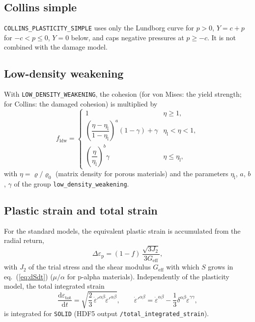 \documentclass[10pt,fleqn,twoside]{article}
\newcommand{\code}[1]{\texttt{#1}}
\newcommand{\sw}[1]{\texttt{#1}}
\newcommand{\dd}{\mathrm{d}}
\begin{document}
\subsection{Collins simple}
\sw{COLLINS\_PLASTICITY\_SIMPLE} uses only the Lundborg curve for $p > 0$, $Y = c + p$ for $-c < p \leq 0$, $Y = 0$
below, and caps negative pressures at $p \geq -c$. It is not combined with the damage model.

\subsection{Low-density weakening}
With \sw{LOW\_DENSITY\_WEAKENING}, the cohesion (for von Mises: the yield strength; for Collins: the damaged cohesion)
is multiplied by
\begin{equation}
 f_\mathrm{ldw} = \begin{cases}
  1 & \eta \geq 1,\\
  \left(\dfrac{\eta-\eta_\mathrm{l}}{1-\eta_\mathrm{l}}\right)^{a}(1-\gamma) + \gamma & \eta_\mathrm{l} < \eta < 1,\\[2ex]
  \left(\dfrac{\eta}{\eta_\mathrm{l}}\right)^{b}\gamma & \eta \leq \eta_\mathrm{l},
 \end{cases}
\end{equation}
with $\eta = \varrho/\varrho_0$ (matrix density for porous materials) and the parameters $\eta_\mathrm{l}$, $a$, $b$,
$\gamma$ of the group \code{low\_density\_weakening}.

\subsection{Plastic strain and total strain}
For the standard models, the equivalent plastic strain is accumulated from the radial return,
\begin{equation}
 \Delta\varepsilon_\mathrm{p} = (1-f)\,\frac{\sqrt{3J_2}}{3G_\mathrm{eff}},
\end{equation}
with $J_2$ of the trial stress and the shear modulus $G_\mathrm{eff}$ with which $S$ grows in eq.~(\ref{eq:dSdt})
($\mu/\alpha$ for p-alpha materials). Independently of the plasticity model, the total integrated strain
\begin{equation}
 \frac{\dd\varepsilon_\mathrm{tot}}{\dd t} = \sqrt{\frac{2}{3}\,\dot\varepsilon'^{\alpha\beta}\dot\varepsilon'^{\alpha\beta}},
 \qquad \dot\varepsilon'^{\alpha\beta} = \dot\varepsilon^{\alpha\beta}
   - \frac{1}{3}\delta^{\alpha\beta}\dot\varepsilon^{\gamma\gamma},
\end{equation}
is integrated for \sw{SOLID} (HDF5 output \code{/total\_integrated\_strain}).
\end{document}
